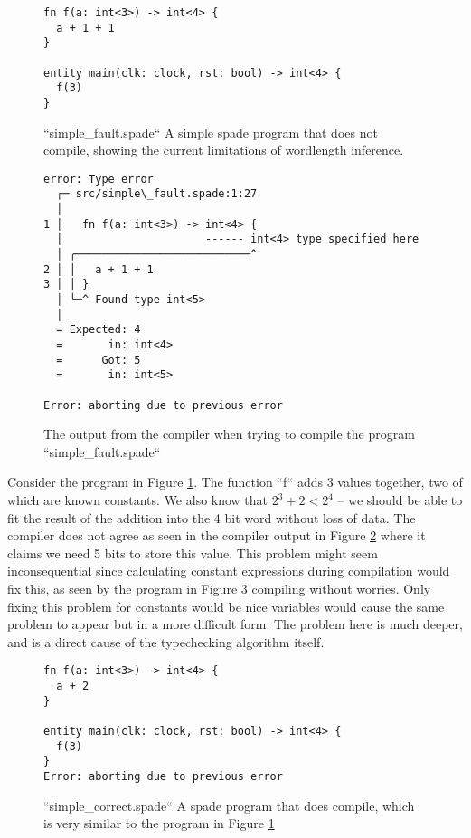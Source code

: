 \begin{figure}[h]
\begin{center}
\begin{verbatim}
fn f(a: int<3>) -> int<4> {
  a + 1 + 1
}

entity main(clk: clock, rst: bool) -> int<4> {
  f(3)
}
\end{verbatim}
\end{center}
\label{fig:SimpleFaultSpade}
\caption{``simple\_fault.spade`` A simple spade program that does not compile, showing the current limitations of wordlength inference.}
\end{figure}

\begin{figure}[h]
\begin{center}
\begin{verbatim}
error: Type error
  ┌─ src/simple\_fault.spade:1:27
  │
1 │   fn f(a: int<3>) -> int<4> {
  │                      ------ int<4> type specified here
  │ ╭───────────────────────────^
2 │ │   a + 1 + 1
3 │ │ }
  │ ╰─^ Found type int<5>
  │
  = Expected: 4
  =       in: int<4>
  =      Got: 5
  =       in: int<5>

Error: aborting due to previous error
\end{verbatim}
\end{center}
\label{fig:SimpleFaultSpadeCompileOutput}
\caption{The output from the compiler when trying to compile the program ``simple\_fault.spade``}
\end{figure}

Consider the program in Figure \ref{fig:SimpleFaultSpade}. The function ``f`` adds 3 values together, two of which are known constants. We also know that $2^3 + 2 < 2^4$ -- we should be able to fit the result of the addition into the 4 bit word without loss of data. The compiler does not agree as seen in the compiler output in Figure \ref{fig:SimpleFaultSpadeCompileOutput} where it claims we need 5 bits to store this value. This problem might seem inconsequential since calculating constant expressions during compilation would fix this, as seen by the program in Figure \ref{fig:SimpleCorrectSpade} compiling without worries. Only fixing this problem for constants would be nice variables would cause the same problem to appear but in a more difficult form. The problem here is much deeper, and is a direct cause of the typechecking algorithm itself.

\begin{figure}[h]
\begin{center}
\begin{verbatim}
fn f(a: int<3>) -> int<4> {
  a + 2
}

entity main(clk: clock, rst: bool) -> int<4> {
  f(3)
}
Error: aborting due to previous error
\end{verbatim}
\end{center}
\label{fig:SimpleCorrectSpade}
\caption{``simple\_correct.spade`` A spade program that does compile, which is very similar to the program in Figure \ref{fig:SimpleFaultSpade}}
\end{figure}

